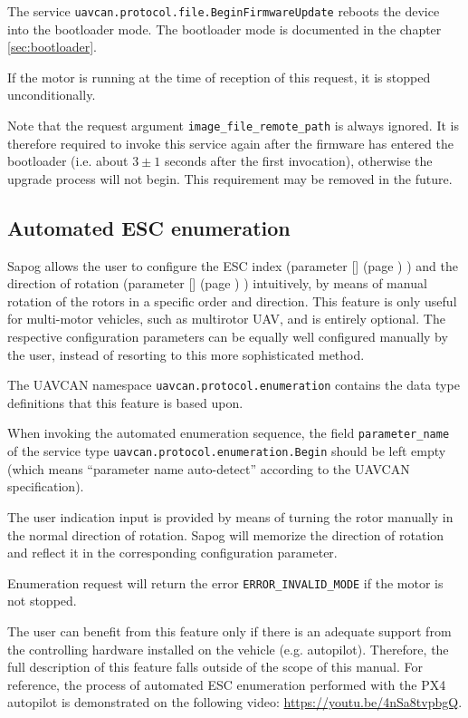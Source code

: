 \documentclass{zubaxdoc}
\newcommand{\CfgRef}[1]{%
    \StrSubstitute{#1}{+}{\textunderscore}[\temp]%
    \texttt{\temp} {\footnotesize (page \pageref{#1})}%
    \xifinlistcs{\thepage}{#1}%
    {}%
    {\listcsxadd{#1}{\thepage}} %
}
\begin{document}
The service \verb|uavcan.protocol.file.BeginFirmwareUpdate| reboots the device into the bootloader
mode.
The bootloader mode is documented in the chapter \ref{sec:bootloader}.

If the motor is running at the time of reception of this request, it is stopped unconditionally.

Note that the request argument \verb|image_file_remote_path| is always ignored.
It is therefore required to invoke this service again after the firmware has entered the bootloader
(i.e. about $3\pm{}1$ seconds after the first invocation),
otherwise the upgrade process will not begin.
This requirement may be removed in the future.

\subsection{Automated ESC enumeration}

Sapog allows the user to configure the ESC index (parameter \CfgRef{esc+index})
and the direction of rotation (parameter \CfgRef{ctl+dir}) intuitively,
by means of manual rotation of the rotors in a specific order and direction.
This feature is only useful for multi-motor vehicles, such as multirotor UAV,
and is entirely optional.
The respective configuration parameters can be equally well configured manually
by the user, instead of resorting to this more sophisticated method.

The UAVCAN namespace \verb|uavcan.protocol.enumeration| contains the data type definitions that
this feature is based upon.

When invoking the automated enumeration sequence, the field \verb|parameter_name|
of the service type \verb|uavcan.protocol.enumeration.Begin| should be left empty
(which means ``parameter name auto-detect'' according to the UAVCAN specification).

The user indication input is provided by means of turning the rotor manually in the normal
direction of rotation.
Sapog will memorize the direction of rotation and reflect it in the corresponding configuration
parameter.

Enumeration request will return the error \verb|ERROR_INVALID_MODE| if the motor is not stopped.

The user can benefit from this feature only if there is an adequate support from the
controlling hardware installed on the vehicle (e.g. autopilot).
Therefore, the full description of this feature falls outside of the scope of this
manual.
For reference, the process of automated ESC enumeration performed with the PX4 autopilot
is demonstrated on the following video: \url{https://youtu.be/4nSa8tvpbgQ}.
\end{document}
